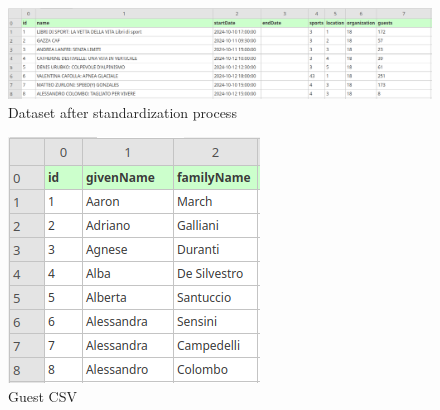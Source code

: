 \begin{figure}[H]
    \centering
    \includegraphics[width=1\linewidth]{knowdive-files/standardized_dataset.png}
    \caption{Dataset after standardization process}
    \label{fig:standardized_data}
\end{figure}
\begin{figure}
    \centering
    \includegraphics[width=0.23\linewidth]{knowdive-files/guest_dataset.png}
    \caption{Guest CSV}
    \label{fig:guest_csv}
\end{figure}

